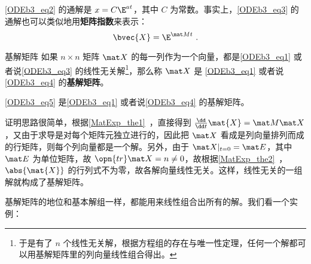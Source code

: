 \autoref{ODEb3_eq2} 的通解是 $x=C\E^{at}$，其中 $C$ 为常数。事实上，\autoref{ODEb3_eq3} 的通解也可以类似地用\textbf{矩阵指数}来表示：
\begin{equation}\label{ODEb3_eq5}
\bvec{X}=\E^{\mat Mt}~.
\end{equation}

\begin{definition}{基解矩阵}
如果 $n\times n$ 矩阵 $\mat X$ 的每一列作为一个向量，都是\autoref{ODEb3_eq1} 或者说\autoref{ODEb3_eq3} 的线性无关解\footnote{于是有了 $n$ 个线性无关解，根据方程组的存在与唯一性定理，任何一个解都可以用基解矩阵里的列向量线性组合得出。}，那么称 $\mat X$ 是 \autoref{ODEb3_eq1} 或者说\autoref{ODEb3_eq4} 的\textbf{基解矩阵}。
\end{definition}

\begin{theorem}{}
\autoref{ODEb3_eq5} 是\autoref{ODEb3_eq1} 或者说\autoref{ODEb3_eq4} 的基解矩阵。
\end{theorem}

证明思路很简单，根据\autoref{MatExp_the1}~，直接得到 $\frac{\dd}{\dd t}\mat{X}=\mat M\mat X$，又由于求导是对每个矩阵元独立进行的，因此把 $\mat X$ 看成是列向量排列而成的行矩阵，则每个列向量都是一个解。另外，由于 $\mat X|_{t=0}=\mat E$，其中 $\mat E$ 为单位矩阵，故 $\opn{tr}\mat X=n\not=0$，故根据\autoref{MatExp_the2}~，$\abs{\mat{X}}$ 的行列式不为零，故各解向量线性无关。这样，线性无关的一组解就构成了基解矩阵。


基解矩阵的地位和基本解组一样，都能用来线性组合出所有的解。我们看一个实例：

